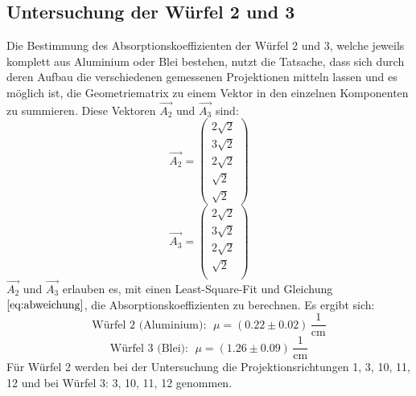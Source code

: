 \subsection{Untersuchung der Würfel 2 und 3}
Die Bestimmung des Absorptionskoeffizienten der Würfel 2 und 3, welche jeweils komplett aus Aluminium oder Blei bestehen, nutzt die Tatsache, dass sich durch deren Aufbau die verschiedenen gemessenen Projektionen mitteln lassen
und es möglich ist, die Geometriematrix zu einem Vektor in den einzelnen Komponenten zu summieren. Diese Vektoren $\vec{A_2}$ und $\vec{A_3}$ sind:
\begin{equation}
	\vec{A_2}=
	\begin{pmatrix}
		2\sqrt{2} \\
		3\sqrt{2} \\
		2\sqrt{2} \\
		\sqrt{2}\\
    \sqrt{2}
	\end{pmatrix}
\end{equation}
\begin{equation}
	\vec{A_3}=
	\begin{pmatrix}
		2\sqrt{2} \\
		3\sqrt{2} \\
		2\sqrt{2} \\
		\sqrt{2}\\
	\end{pmatrix}
\end{equation}
$\vec{A_2}$ und $\vec{A_3}$ erlauben es, mit einen Least-Square-Fit und Gleichung $\ref{eq:abweichung}$, die Absorptionskoeffizienten zu berechnen.
\clearpage
Es ergibt sich:
\begin{equation*}
  \text{Würfel 2 (Aluminium): }\; \mu = (0.22 \pm 0.02) \, \frac{1}{\si{\centi\meter}}
\end{equation*}
\begin{equation*}
  \text{Würfel 3 (Blei): } \; \mu = (1.26 \pm 0.09) \, \frac{1}{\si{\centi\meter}}
\end{equation*}
Für Würfel 2 werden bei der Untersuchung die Projektionsrichtungen 1, 3, 10, 11, 12 und bei Würfel 3: 3, 10, 11, 12 genommen.
